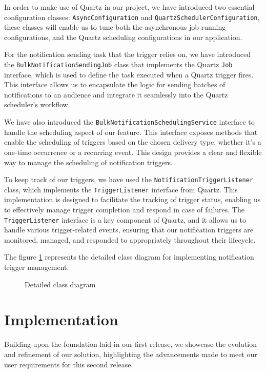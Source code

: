 In order to make use of Quartz in our project, we have introduced two essential configuration classes:
\texttt{AsyncConfiguration} and \texttt{QuartzSchedulerConfiguration}, these classes will enable
us to tune both the asynchronous job running configurations, and the Quartz
scheduling configurations in our application.

For the notification sending task that the trigger relies on, we have introduced the
\texttt{BulkNotificationSendingJob} class that implements the Quartz \texttt{Job} interface,
which is used to define the task executed when a Quartz trigger fires. This interface allows us
to encapsulate the logic for sending batches of notifications to an audience and integrate it seamlessly
into the Quartz scheduler's workflow.

We have also introduced the \texttt{BulkNotificationSchedulingService} interface to handle the scheduling aspect of
our feature. This interface exposes methods that enable the scheduling of triggers based on the
chosen delivery type, whether it's a one-time occurrence or a recurring event. This design provides
a clear and flexible way to manage the scheduling of notification triggers.

To keep track of our triggers, we have used the \texttt{NotificationTriggerListener} class,
which implements the \texttt{TriggerListener} interface from Quartz. This implementation is designed to
facilitate the tracking of trigger status, enabling us to effectively manage trigger completion and
respond in case of failures. The \texttt{TriggerListener} interface is a key component of Quartz,
and it allows us to handle various trigger-related events, ensuring that our notification triggers are
monitored, managed, and responded to appropriately throughout their lifecycle.


\noindent The figure \ref{detailed-2} represents the detailed class diagram for implementing notification
trigger management.


\begin{landscape}
    \begin{figure}[hbt!]
        \centering
        
        \caption{Detailed class diagram}
        \label{detailed-2}
    \end{figure}
\end{landscape}



\section{Implementation}
Building upon the foundation laid in our first release, we showcase the evolution and refinement of
our solution, highlighting the advancements made to meet our user requirements for this second release.

